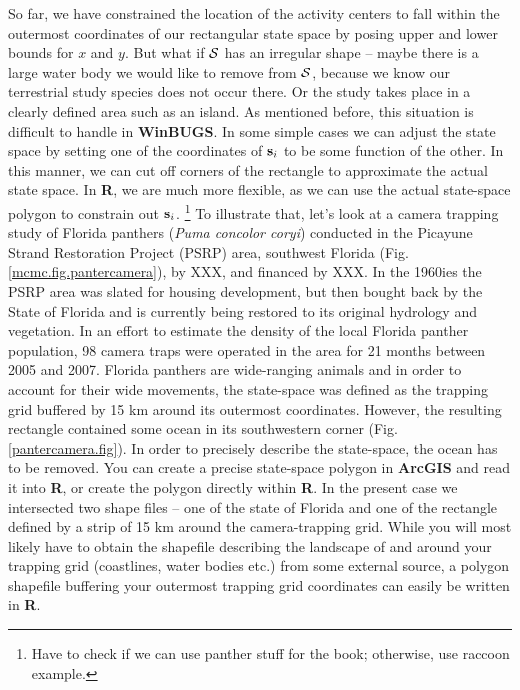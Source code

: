 So far, we have constrained the location of the activity centers to fall
within the outermost coordinates of our rectangular state space by posing 
upper and lower bounds for $x$ and $y$. But what if ${\cal S}$ 
has an irregular 
shape -- maybe there is a large water body we would like to remove from 
${\cal S}$, because we know our terrestrial study species does not occur there.
Or the study takes place in a clearly defined area such as an island. 
As mentioned before, this situation is difficult to handle in {\bf WinBUGS}.
In some simple cases we can adjust the state space by setting one of the
coordinates of ${\bf s}_{i}$ to be some function of the other. 
In this manner, we can cut off corners of the rectangle to approximate 
the actual state space. In {\bf R}, we are much more flexible, as we can 
use the actual state-space polygon to constrain out ${\bf s}_i$. 
\footnote{ Have to check if we can use panther stuff for the book; 
otherwise, use raccoon example.} To illustrate that, let's look at a camera 
trapping study of Florida panthers (\emph{Puma concolor coryi}) conducted 
in the Picayune Strand Restoration Project (PSRP) area, southwest Florida 
(Fig. \ref{mcmc.fig.pantercamera}), by XXX, and financed by XXX. In the 1960ies 
the PSRP area was slated for housing development, but then bought back by 
the State of Florida and is currently being restored to its original 
hydrology and vegetation. In an effort to estimate the density of the 
local Florida panther population, 98 camera traps were operated in the area 
for 21 months between 2005 and 2007. Florida panthers are wide-ranging 
animals and in order to account for their wide movements, the state-space 
was defined as the trapping grid buffered by 15 km around its outermost 
coordinates. However, the resulting rectangle contained some ocean in its 
southwestern corner (Fig. \ref{pantercamera.fig}).
In order to precisely describe the state-space, the ocean has to be 
removed. You can create a precise state-space polygon in {\bf ArcGIS} and 
read it into {\bf R}, or create the polygon directly within {\bf R}. In 
the present case we intersected two shape files -- one of the state of 
Florida and one of the rectangle defined by a strip of 15 km around the
 camera-trapping grid.
While you will most likely have to obtain the shapefile describing the 
landscape of and around your trapping grid (coastlines, water bodies etc.) 
from some external source, a polygon shapefile buffering your outermost 
trapping grid coordinates can easily be written in {\bf R}.

